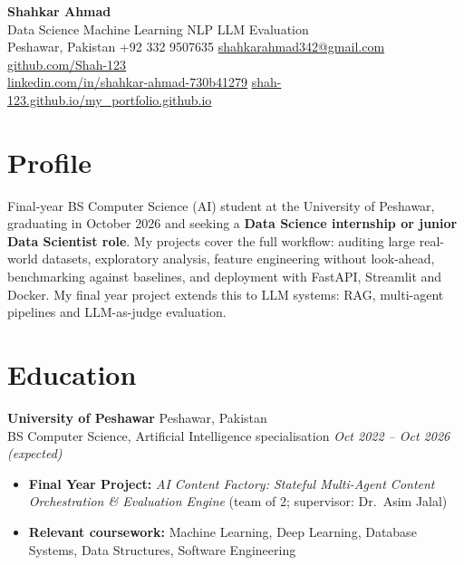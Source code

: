 \documentclass[10pt,a4paper]{article}
\begin{document}
\begin{center}
  {\fontsize{24}{28}\selectfont\bfseries\color{accent} Shahkar Ahmad}\\[4pt]
  {\large Data Science \textbullet{} Machine Learning \textbullet{} NLP \textbullet{} LLM Evaluation}\\[4pt]
  \small
  Peshawar, Pakistan \enspace\textbar\enspace +92 332 9507635 \enspace\textbar\enspace
  \href{mailto:shahkarahmad342@gmail.com}{shahkarahmad342@gmail.com} \enspace\textbar\enspace
  \href{https://github.com/Shah-123}{github.com/Shah-123}\\[1pt]
  \href{https://www.linkedin.com/in/shahkar-ahmad-730b41279/}{linkedin.com/in/shahkar-ahmad-730b41279}
  \enspace\textbar\enspace
  \href{https://shah-123.github.io/my_portfolio.github.io/}{shah-123.github.io/my\_portfolio.github.io}
\end{center}
\vspace{-6pt}

\section{Profile}
Final-year BS Computer Science (AI) student at the University of Peshawar, graduating in October
2026 and seeking a \textbf{Data Science internship or junior Data Scientist role}. My projects cover
the full workflow: auditing large real-world datasets, exploratory analysis, feature engineering
without look-ahead, benchmarking against baselines, and deployment with FastAPI, Streamlit and
Docker. My final year project extends this to LLM systems: RAG, multi-agent pipelines and
LLM-as-judge evaluation.

\section{Education}
\textbf{University of Peshawar} \hfill Peshawar, Pakistan\\
BS Computer Science, Artificial Intelligence specialisation \hfill
\textit{Oct 2022 -- Oct 2026 (expected)}
\begin{itemize}
  \item \textbf{Final Year Project:} \textit{AI Content Factory: Stateful Multi-Agent Content
        Orchestration \& Evaluation Engine} (team of 2; supervisor: Dr.\ Asim Jalal)
  \item \textbf{Relevant coursework:} Machine Learning, Deep Learning, Database Systems,
        Data Structures, Software Engineering
\end{itemize}
\end{document}
